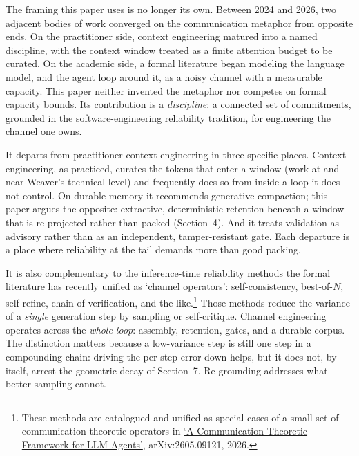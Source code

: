 \documentclass[11pt, a4paper]{article}
\begin{document}
The framing this paper uses is no longer its own. Between 2024 and 2026, two adjacent
bodies of work converged on the communication metaphor from opposite ends. On the
practitioner side, context engineering matured into a named discipline, with the context
window treated as a finite attention budget to be curated. On the academic side, a formal
literature began modeling the language model, and the agent loop around it, as a noisy
channel with a measurable capacity. This paper neither invented the metaphor nor competes
on formal capacity bounds. Its contribution is a \emph{discipline}: a connected set of
commitments, grounded in the software-engineering reliability tradition, for engineering
the channel one owns.

It departs from practitioner context engineering in three specific places. Context
engineering, as practiced, curates the tokens that enter a window (work at and near
Weaver's technical level) and
frequently does so from inside a loop it does not control. On durable memory it recommends
generative compaction; this paper argues the opposite: extractive, deterministic
retention beneath a window that is re-projected rather than packed (Section~4). And it
treats validation as advisory rather than as an independent, tamper-resistant gate. Each
departure is a place where reliability at the tail demands more than good packing.

It is also complementary to the inference-time reliability
methods the formal literature has recently unified as `channel operators': self-consistency,
best-of-$N$, self-refine, chain-of-verification, and the like.\footnote{These methods are
catalogued and unified as special cases of a small set of communication-theoretic operators
in \href{https://arxiv.org/abs/2605.09121}{`A Communication-Theoretic Framework for LLM
Agents'}, arXiv:2605.09121, 2026.} Those methods reduce the variance of a \emph{single}
generation step by sampling or self-critique. Channel engineering operates across the
\emph{whole loop}: assembly, retention, gates, and a durable corpus. The distinction
matters because a low-variance step is still one step in a compounding chain: driving the
per-step error down helps, but it does not, by itself, arrest the geometric decay of
Section~7. Re-grounding addresses what better sampling cannot.
\end{document}
